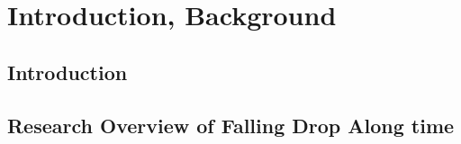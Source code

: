 \documentclass[12pt]{article}
\begin{document}



\section{Introduction, Background}

\subsection{Introduction}





\subsection{Research Overview of Falling Drop Along time}
\end{document}
